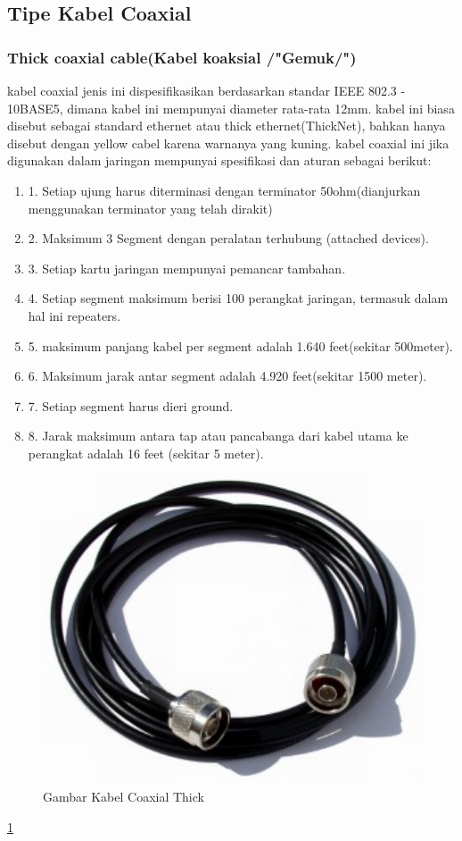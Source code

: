 \begin{itemize}
{\begin{itemize}
\begin{itemize}
	\subsection{Tipe Kabel Coaxial}
		\subsubsection{Thick coaxial cable(Kabel koaksial /"Gemuk/")}
		kabel coaxial jenis ini dispesifikasikan berdasarkan standar IEEE 802.3 - 10BASE5, dimana kabel ini mempunyai diameter rata-rata 12mm. kabel ini biasa disebut sebagai standard ethernet atau thick ethernet(ThickNet), bahkan hanya disebut dengan yellow cabel karena warnanya yang kuning.
		kabel coaxial ini jika digunakan dalam jaringan mempunyai spesifikasi dan aturan sebagai berikut:
			\begin{enumerate}
				\item 1. Setiap ujung harus diterminasi dengan terminator 50ohm(dianjurkan menggunakan terminator yang telah dirakit)
				\item 2. Maksimum 3 Segment dengan peralatan terhubung (attached devices).
				\item 3. Setiap kartu jaringan mempunyai pemancar tambahan.
				\item 4. Setiap segment maksimum berisi 100 perangkat jaringan, termasuk dalam hal ini repeaters.
				\item 5. maksimum panjang kabel per segment adalah 1.640 feet(sekitar 500meter).
				\item 6. Maksimum jarak antar segment adalah 4.920 feet(sekitar 1500 meter).
				\item 7. Setiap segment harus dieri ground.
				\item 8. Jarak maksimum antara tap atau pancabanga dari kabel utama ke perangkat adalah 16 feet (sekitar 5 meter).
			\end{enumerate}
\begin{figure} [ht]
	\centerline{\includegraphics[width=1\textwidth]{figures/thickcoax.jpg}}
	\caption{Gambar Kabel Coaxial Thick}
	\label{thickcoax}
\end{figure}
	\ref{thickcoax}

\end{itemize}
\end{itemize}}
\end{itemize}
